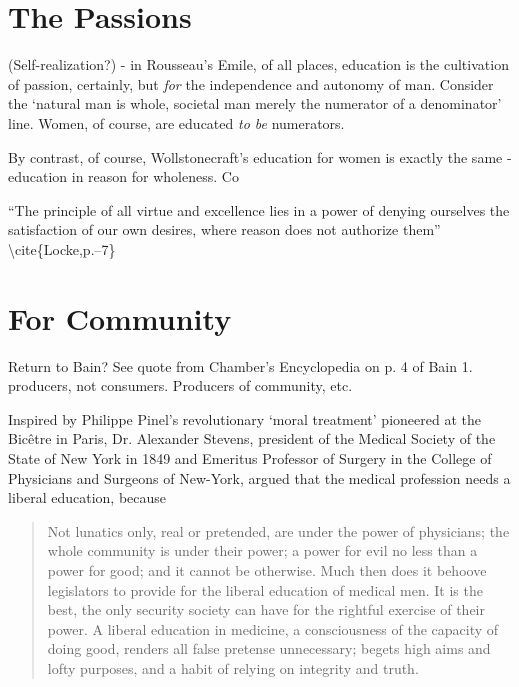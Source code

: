 \section{The Passions}
\label{thepassions}

(Self-realization?) - in Rousseau's Emile, of all places, education is the cultivation of passion, certainly, but \emph{for} the independence and autonomy of man. Consider the `natural man is whole, societal man merely the numerator of a denominator' line. Women, of course, are educated \emph{to be} numerators.

By contrast, of course, Wollstonecraft's education for women is exactly the same - education in reason for wholeness.
Co

``The principle of all virtue and excellence lies in a power of denying ourselves the satisfaction of our own desires, where reason does not authorize them'' \textbackslash{}cite\{Locke,p.--7\}

\section{For Community}
\label{forcommunity}

Return to Bain? See quote from Chamber's Encyclopedia on p. 4 of Bain 1.\\
producers, not consumers. Producers of community, etc.

Inspired by Philippe Pinel's revolutionary `moral treatment' pioneered at the Bicêtre in Paris, Dr. Alexander Stevens, president of the Medical Society of the State of New York in 1849 and Emeritus Professor of Surgery in the College of Physicians and Surgeons of New-York, argued that the medical profession needs a liberal education, because 

\begin{quote}

Not lunatics only, real or pretended, are under the power of physicians; the whole community is under their power; a power for evil no less than a power for good; and it cannot be otherwise. Much then does it behoove legislators to provide for the liberal education of medical men. It is the best, the only security society can have for the rightful exercise of their power. A liberal education in medicine, a consciousness of the capacity of doing good, renders all false pretense unnecessary; begets high aims and lofty purposes, and a habit of relying on integrity and truth. ~\citep[p. 15]{Stevens:1849vc}
\end{quote}

